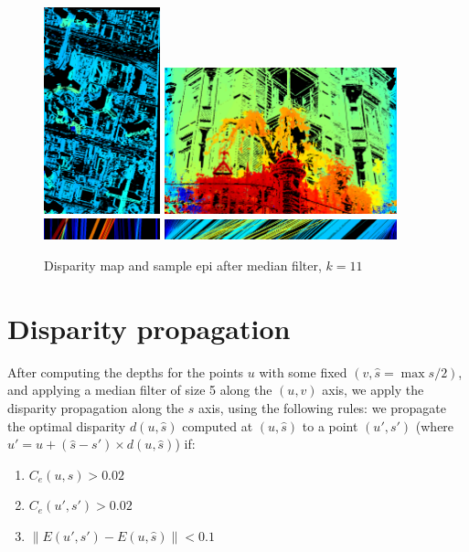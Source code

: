 \documentclass{article}
\newcommand{\norm}[1]{\left\lVert#1\right\rVert}
\theoremstyle{definition}
\begin{document}
\begin{figure}[ht]
  \centering
  \includegraphics[width=0.3\textwidth]{images/1520617394231_dmap.png}
  \includegraphics[width=0.6\textwidth]{images/1520618708656_dmap.png} \\
  
  \includegraphics[width=0.3\textwidth]{images/1520617394231_epi_colored.png}
  \includegraphics[width=0.6\textwidth]{images/1520618708656_epi_colored.png}
  \caption{Disparity map and sample epi after median filter, $k=11$}
  \label{fig:median:11}
\end{figure}


\clearpage
\section{Disparity propagation}


After computing the depths for the points $u$ with some fixed $(v, \widehat{s} = \max s / 2)$, and applying a median filter of size 5 along the $(u, v)$ axis, we apply the disparity propagation along the $s$ axis, using the following rules: we propagate the optimal disparity $d(u, \widehat{s})$ computed at $(u, \widehat{s})$ to a point $(u', s')$ (where $u' = u + (\widehat{s} - s') \times d(u, \widehat{s})$) if:
\begin{enumerate}
 \item $C_e(u, s) > 0.02$
 \item $C_e(u', s') > 0.02$
 \item $\norm{E(u', s') - E(u, \widehat{s})} < 0.1$
\end{enumerate}
\end{document}
